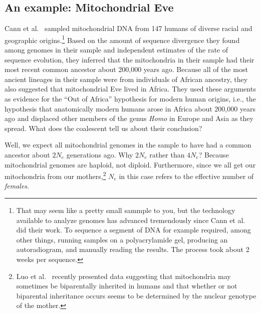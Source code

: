 \subsection*{An example: Mitochondrial
  Eve}

Cann et al.~\cite{Cann-etal-1987} sampled mitochondrial DNA from 147
humans of diverse racial and geographic origins.\footnote{That may
  seem like a pretty small sammple to you, but the technology
  available to analyze genomes has advanced tremendously since Cann et
  al. did their work. To sequence a segment of DNA for example
  required, among other things, running samples on a polyacrylamide
  gel, producing an autoradiogram, and manually reading the
  results. The process took about 2 weeks per sequence.}  Based on the
amount of sequence divergence they found among genomes in their sample
and independent estimates of the rate of sequence evolution, they
inferred that the mitochondria in their sample had their most recent
common ancestor about 200,000 years ago. Because all of the most
ancient lineages in their sample were from individuals of African
ancestry, they also suggested that mitochondrial Eve lived in
Africa. They used these arguments as evidence for the ``Out of
Africa'' hypothesis for modern human origins, i.e., the hypothesis
that anatomically modern humans arose in Africa about 200,000 years
ago and displaced other members of the genus {\it Homo\/} in Europe
and Asia as they spread. What does the coalescent tell us about their
conclusion?

Well, we expect all mitochondrial genomes in the sample to have had a
common ancestor about $2N_e$ generations ago. Why $2N_e$ rather than
$4N_e$? Because mitochondrial genomes are haploid, not
diploid. Furthermore, since we all get our mitochondria from our
mothers,\footnote{Luo et al.~\cite{Luo-etal-2018} recently presented
  data suggesting that mitochondria may sometimes be biparentally
  inherited in humans and that whether or not biparental inheritance
  occurs seems to be determined by the nuclear genotype of the
  mother.} $N_e$ in this case refers to the effective number of {\it
  females}.

